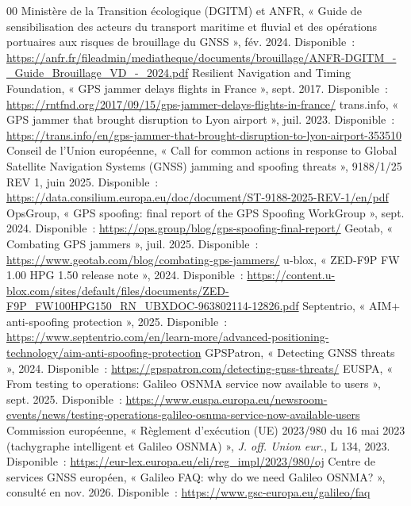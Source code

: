 \documentclass[conference]{IEEEtran}
\begin{document}
\begin{thebibliography}{00}\NoAutoSpacing
{} Ministère de la Transition écologique (DGITM) et ANFR, « Guide de sensibilisation des acteurs du transport maritime et fluvial et des opérations portuaires aux risques de brouillage du GNSS », fév. 2024. Disponible~: \url{https://anfr.fr/fileadmin/mediatheque/documents/brouillage/ANFR-DGITM_-_Guide_Brouillage_VD_-_2024.pdf}
 Resilient Navigation and Timing Foundation, « GPS jammer delays flights in France », sept. 2017. Disponible~: \url{https://rntfnd.org/2017/09/15/gps-jammer-delays-flights-in-france/}
 trans.info, « GPS jammer that brought disruption to Lyon airport », juil. 2023. Disponible~: \url{https://trans.info/en/gps-jammer-that-brought-disruption-to-lyon-airport-353510}
 Conseil de l'Union européenne, « Call for common actions in response to Global Satellite Navigation Systems (GNSS) jamming and spoofing threats », 9188/1/25 REV 1, juin 2025. Disponible~: \url{https://data.consilium.europa.eu/doc/document/ST-9188-2025-REV-1/en/pdf}
 OpsGroup, « GPS spoofing: final report of the GPS Spoofing WorkGroup », sept. 2024. Disponible~: \url{https://ops.group/blog/gps-spoofing-final-report/}
 Geotab, « Combating GPS jammers », juil. 2025. Disponible~: \url{https://www.geotab.com/blog/combating-gps-jammers/}
 u-blox, « ZED-F9P FW 1.00 HPG 1.50 release note », 2024. Disponible~: \url{https://content.u-blox.com/sites/default/files/documents/ZED-F9P_FW100HPG150_RN_UBXDOC-963802114-12826.pdf}
 Septentrio, « AIM+ anti-spoofing protection », 2025. Disponible~: \url{https://www.septentrio.com/en/learn-more/advanced-positioning-technology/aim-anti-spoofing-protection}
 GPSPatron, « Detecting GNSS threats », 2024. Disponible~: \url{https://gpspatron.com/detecting-gnss-threats/}
 EUSPA, « From testing to operations: Galileo OSNMA service now available to users », sept. 2025. Disponible~: \url{https://www.euspa.europa.eu/newsroom-events/news/testing-operations-galileo-osnma-service-now-available-users}
 Commission européenne, « Règlement d'exécution (UE) 2023/980 du 16 mai 2023 (tachygraphe intelligent et Galileo OSNMA) », \emph{J. off. Union eur.}, L 134, 2023. Disponible~: \url{https://eur-lex.europa.eu/eli/reg_impl/2023/980/oj}
 Centre de services GNSS européen, « Galileo FAQ: why do we need Galileo OSNMA? », consulté en nov. 2026. Disponible~: \url{https://www.gsc-europa.eu/galileo/faq}

\end{thebibliography}
\end{document}
